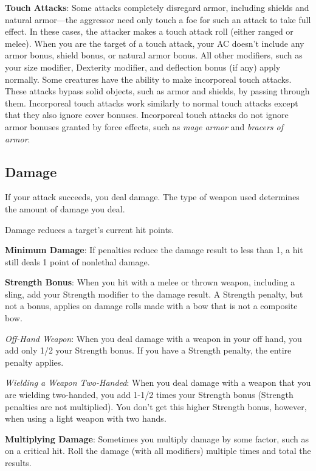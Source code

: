 \textbf{Touch Attacks}: Some attacks completely disregard armor, including shields and natural armor---the aggressor need only touch a foe for such an attack to take full effect. In these cases, the attacker makes a touch attack roll (either ranged or melee). When you are the target of a touch attack, your AC doesn't include any armor bonus, shield bonus, or natural armor bonus. All other modifiers, such as your size modifier, Dexterity modifier, and deflection bonus (if any) apply normally. Some creatures have the ability to make incorporeal touch attacks. These attacks bypass solid objects, such as armor and shields, by passing through them. Incorporeal touch attacks work similarly to normal touch attacks except that they also ignore cover bonuses. Incorporeal touch attacks do not ignore armor bonuses granted by force effects, such as \textit{mage armor} and \textit{bracers of armor}.
				
\subsection{Damage}

				
If your attack succeeds, you deal damage. The type of weapon used determines the amount of damage you deal. 
				
Damage reduces a target's current hit points.
				
\textbf{Minimum Damage}: If penalties reduce the damage result to less than 1, a hit still deals 1 point of nonlethal damage.
				
\textbf{Strength Bonus}: When you hit with a melee or thrown weapon, including a sling, add your Strength modifier to the damage result. A Strength penalty, but not a bonus, applies on damage rolls made with a bow that is not a composite bow.
				
\textit{Off-Hand Weapon}: When you deal damage with a weapon in your off hand, you add only 1/2 your Strength bonus. If you have a Strength penalty, the entire penalty applies.
				
\textit{Wielding a Weapon Two-Handed}: When you deal damage with a weapon that you are wielding two-handed, you add 1-1/2 times your Strength bonus (Strength penalties are not multiplied). You don't get this higher Strength bonus, however, when using a light weapon with two hands.
				
\textbf{Multiplying Damage}: Sometimes you multiply damage by some factor, such as on a critical hit. Roll the damage (with all modifiers) multiple times and total the results. 
				
